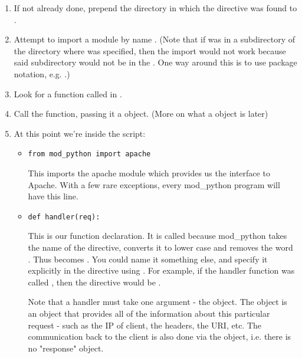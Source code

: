 \begin{enumerate}

\item
If not already done, prepend the directory in which the
 directive was found to .

\item
Attempt to import a module by name . (Note that if
 was in a subdirectory of the directory where
 was specified, then the import would not work
because said subdirectory would not be in the . One way
around this is to use package notation, e.g. .)

\item 
Look for a function called  in .

\item
Call the function, passing it a  object. (More on what a
 object is later)

\item
At this point we're inside the script: 

\begin{itemize}

\item
\begin{verbatim}
from mod_python import apache
\end{verbatim}

This imports the apache module which provides us the interface to
Apache. With a few rare exceptions, every mod_python program will have
this line.

\item
\begin{verbatim}
def handler(req):
\end{verbatim}

 This is our  function declaration. It is
called  because mod_python takes the name of the
directive, converts it to lower case and removes the word
. Thus  becomes
. You could name it something else, and specify it
explicitly in the directive using \samp{::}. For example, if the
handler function was called , then the directive would be
.

Note that a handler must take one argument - the 
object. The  object is an object that provides all of
the information about this particular request - such as the IP of
client, the headers, the URI, etc. The communication back to the
client is also done via the  object, i.e. there is no
"response" object.


\end{itemize}
\end{enumerate}
